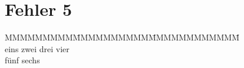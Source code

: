 \section{Fehler 5}

\begin{tabbing}
MMMMMMMMM\=MMMMMMMMMM\=MMMMMMMMMMMM\=\kill\\
eins\> zwei\> drei\> vier\\
fünf\> sechs\\
\end{tabbing}

